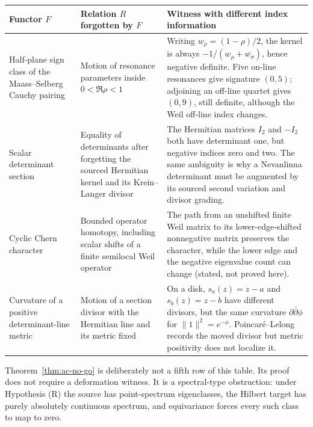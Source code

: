 \documentclass[11pt]{amsart}
\theoremstyle{definition}
\theoremstyle{remark}
\begin{document}
\begin{center}
\small
\renewcommand{\arraystretch}{1.25}
\begin{tabular}{>{\raggedright\arraybackslash}p{}
                >{\raggedright\arraybackslash}p{}
                >{\raggedright\arraybackslash}p{}}
\toprule
Functor \(F\) & Relation \(R\) forgotten by \(F\) & Witness with different
index information\\
\midrule
Half-plane sign class of the Maass--Selberg Cauchy pairing
& Motion of resonance parameters inside \(0<\Re\rho<1\)
& Writing \(w_\rho=(1-\rho)/2\), the kernel is always
\(-1/(w_\rho+\overline{w_\sigma})\), hence negative definite.  Five
on-line resonances give signature \((0,5)\); adjoining an off-line quartet
gives \((0,9)\), still definite, although the Weil off-line index changes.\\
Scalar determinant section
& Equality of determinants after forgetting the sourced Hermitian kernel
and its Krein--Langer divisor
& The Hermitian matrices \(I_2\) and \(-I_2\) both have determinant one,
but negative indices zero and two.  The same ambiguity is why a
Nevanlinna determinant must be augmented by its sourced second variation
and divisor grading.\\
Cyclic Chern character
& Bounded operator homotopy, including scalar shifts of a finite
semilocal Weil operator
& The path from an unshifted finite Weil matrix to its lower-edge-shifted
nonnegative matrix preserves the character, while the lower edge and the
negative eigenvalue count can change (stated, not proved here).\\
Curvature of a positive determinant-line metric
& Motion of a section divisor with the Hermitian line and its metric fixed
& On a disk, \(s_a(z)=z-a\) and \(s_b(z)=z-b\) have different divisors,
but the same curvature \(\partial\bar\partial\phi\) for
\(\|1\|^2=e^{-\phi}\).  Poincar\'e--Lelong records the moved divisor but
metric positivity does not localize it.\\
\bottomrule
\end{tabular}
\end{center}

Theorem~\ref{thm:ac-no-go} is deliberately not a fifth row of this table.
Its proof does not require a deformation witness.  It is a spectral-type
obstruction: under Hypothesis (R) the source has point-spectrum eigenclasses, the Hilbert target
has purely absolutely continuous spectrum, and equivariance forces every
such class to map to zero.
\end{document}
